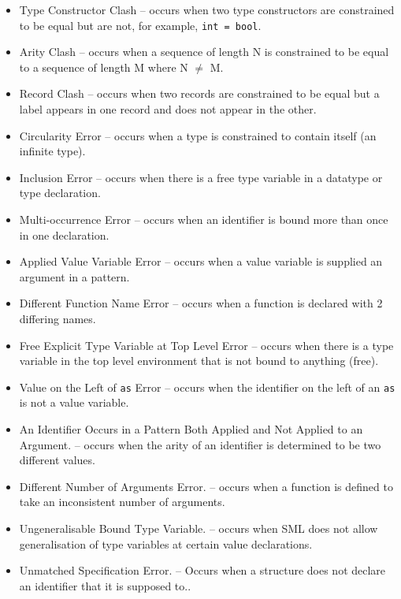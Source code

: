 \documentclass{report}
\begin{document}
\begin{itemize}

\item Type Constructor Clash \subitem -- occurs
  when two type constructors are constrained to be equal but
  are not, for example, \texttt{int = bool}.
\item Arity Clash \subitem -- occurs when a sequence of length N is
  constrained to be equal to a sequence of length M where N $\neq$ M.
\item Record Clash \subitem -- occurs when two records are
  constrained to be equal but a label appears in one record and does
  not appear in the other.
\item Circularity Error \subitem -- occurs when a type is
  constrained to contain itself (an infinite type).
\item Inclusion Error \subitem -- occurs when there is a free type
  variable in a datatype or type declaration.
\item Multi-occurrence Error \subitem -- occurs when an identifier
  is bound more than once in one declaration.
\item Applied Value Variable Error \subitem -- occurs when a value
  variable is supplied an argument in a pattern.
\item Different Function Name Error \subitem -- occurs when a
  function is declared with 2 differing names.
\item Free Explicit Type Variable at Top Level Error \subitem --
  occurs when there is a type variable in the top level environment
  that is not bound to anything (free).
\item Value on the Left of \texttt{as} Error \subitem --
  occurs when the identifier on the left of an \texttt{as} is
  not a value variable.
\item An Identifier Occurs in a Pattern Both Applied and Not Applied to
  an Argument. \subitem -- occurs when the arity of an identifier is determined to be two different values.
\item Different Number of Arguments Error.  \subitem -- occurs when a
  function is defined to take an inconsistent number of arguments.
\item Ungeneralisable Bound Type Variable.  \subitem -- occurs when SML does
  not allow generalisation of type variables at certain value
  declarations.
\item Unmatched Specification Error. \subitem -- Occurs when a structure does not declare an identifier that it is supposed to..
\end{itemize}
\end{document}
